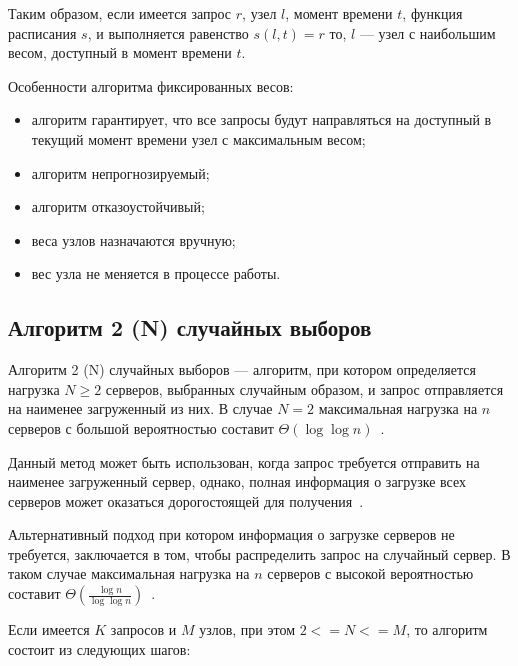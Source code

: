 Таким образом, если имеется запрос $r$, узел $l$, момент времени $t$, функция расписания $s$, и выполняется равенство $s(l, t) = r$ то, $l$ --- узел с наибольшим весом, доступный в момент времени $t$.

Особенности алгоритма фиксированных весов:
\begin{itemize}
	\item алгоритм гарантирует, что все запросы будут направляться на доступный в текущий момент времени узел с максимальным весом;
	\item алгоритм непрогнозируемый;
	\item алгоритм отказоустойчивый;
	\item веса узлов назначаются вручную;
	\item вес узла не меняется в процессе работы.
\end{itemize}

\subsection{Алгоритм 2 (N) случайных выборов}

Алгоритм 2 (N) случайных выборов --- алгоритм, при котором определяется нагрузка $N \ge 2$ серверов, выбранных случайным образом, и запрос отправляется на наименее загруженный из них. 
В случае $N=2$ максимальная нагрузка на $n$ серверов с большой вероятностью составит $\Theta(\log  \log n)$~\cite{pwr2choices}.

Данный метод может быть использован, когда запрос требуется отправить на наименее загруженный сервер, однако, полная информация о загрузке всех серверов может оказаться дорогостоящей для получения~\cite{pwr2choices}.

Альтернативный подход при котором информация о загрузке серверов не требуется, заключается в том, чтобы распределить запрос на случайный сервер.
В таком случае максимальная нагрузка на $n$ серверов с высокой вероятностью составит $\Theta(\frac{\log n }{\log \log n})$~\cite{pwr2choices}.

Если имеется $K$ запросов и $M$ узлов, при этом $2 <= N <= M$, то алгоритм состоит из следующих шагов:

